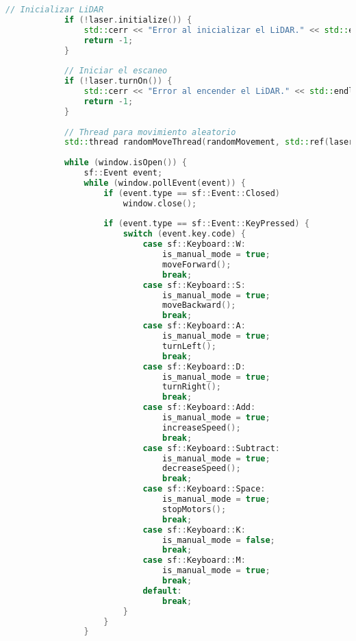 \begin{lstlisting}[language={C++}, caption={Primera versi\'on del c\'odigo del sistema de control del robot}, label={Script}]
            // Inicializar LiDAR
            if (!laser.initialize()) {
                std::cerr << "Error al inicializar el LiDAR." << std::endl;
                return -1;
            }
        
            // Iniciar el escaneo
            if (!laser.turnOn()) {
                std::cerr << "Error al encender el LiDAR." << std::endl;
                return -1;
            }
        
            // Thread para movimiento aleatorio
            std::thread randomMoveThread(randomMovement, std::ref(laser));
        
            while (window.isOpen()) {
                sf::Event event;
                while (window.pollEvent(event)) {
                    if (event.type == sf::Event::Closed)
                        window.close();
        
                    if (event.type == sf::Event::KeyPressed) {
                        switch (event.key.code) {
                            case sf::Keyboard::W:
                                is_manual_mode = true;
                                moveForward();
                                break;
                            case sf::Keyboard::S:
                                is_manual_mode = true;
                                moveBackward();
                                break;
                            case sf::Keyboard::A:
                                is_manual_mode = true;
                                turnLeft();
                                break;
                            case sf::Keyboard::D:
                                is_manual_mode = true;
                                turnRight();
                                break;
                            case sf::Keyboard::Add:
                                is_manual_mode = true;
                                increaseSpeed();
                                break;
                            case sf::Keyboard::Subtract:
                                is_manual_mode = true;
                                decreaseSpeed();
                                break;
                            case sf::Keyboard::Space:
                                is_manual_mode = true;
                                stopMotors();
                                break;
                            case sf::Keyboard::K:
                                is_manual_mode = false;
                                break;
                            case sf::Keyboard::M:
                                is_manual_mode = true;
                                break;
                            default:
                                break;
                        }
                    }
                }
        

\end{lstlisting}

